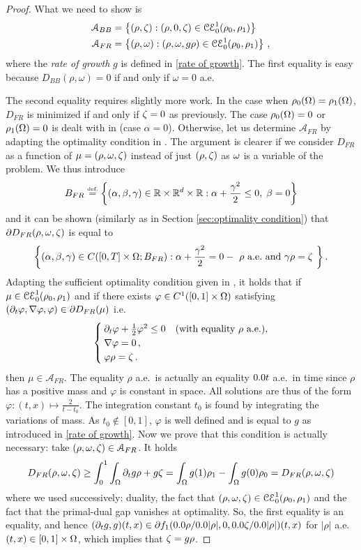 \begin{proof}
What we need to show is
\begin{align*}
\mathcal{A}_{BB} &= \left\{ (\rho,\zeta) : (\rho,0,\zeta) \in \mathcal{CE}_0^1(\rho_0,\rho_1) \right\} \\
\mathcal{A}_{FR} &= \left\{ (\rho,\omega) : (\rho,\omega,g \rho) \in \mathcal{CE}_0^1(\rho_0,\rho_1)  \right\}\, ,
\end{align*}
where the \emph{rate of growth} $g$ is defined in \eqref{rate of growth}. The first equality is easy because $D_{BB}(\rho, \omega)=0$ if and only if $\omega=0$ a.e.

The second equality requires slightly more work. In the case when $\rho_0(\Omega)=\rho_1(\Omega)$, $D_{FR}$ is minimized if and only if $\zeta=0$ as previously. The case $\rho_0(\Omega)=0$ or $\rho_1(\Omega)=0$ is dealt with in  (case $\alpha=0$). Otherwise, let us determine $\mathcal{A}_{FR}$ by adapting the optimality condition in . The argument is clearer if we consider $D_{FR}$ as a function of  $\mu=(\rho,\omega,\zeta)$ instead of just $(\rho,\zeta)$ as $\omega$ is a variable of the problem. We thus introduce
\[
B_{FR} \stackrel{\mbox{\upshape\tiny def.}}{=} \left\{ (\alpha,\beta,\gamma)\in \mathbb{R} \times \mathbb{R}^d \times \mathbb{R} : \alpha +\frac{\gamma^2}{2} \leq 0, \; \beta =0 \right\}
\]
and it can be shown (similarly as in Section \ref{sec:optimality condition}) that $\partial D_{FR} (\rho,\omega,\zeta)$ is equal to
\[
 \left\{ (\alpha,\beta, \gamma) \in C([0,T] \times \Omega; B_{FR}) :
\alpha+\frac{\gamma^2}{2} = 0 -\text{ $\rho$ a.e.\ and $\gamma \rho = \zeta$ }
\right\}.
\]
Adapting the sufficient optimality condition given in , it holds that if $\mu\in \mathcal{CE}_0^1(\rho_0,\rho_1)$ and if
there exists $\varphi \in C^1([0,1] \times \Omega)$ satisfying $(\partial_t \varphi, \nabla \varphi, \varphi)\in \partial D_{FR} (\mu) $ i.e.
\[
\begin{cases}
 \partial_t \varphi + \frac12 \varphi^2 \leq 0 &(\text{with equality $\rho$ a.e.}),\\
\nabla \varphi = 0\, ,\\
\varphi \rho = \zeta \, .
\end{cases}
\] 
then $\mu \in \mathcal{A}_{FR}$.
%
The equality $\rho$ a.e.\ is actually an equality $\d t$ a.e.\ in time since $\rho$ has a positive mass and $\varphi$ is constant in space. All solutions are thus of the form $\varphi : (t,x) \mapsto \frac{2}{t-t_0}$. The integration constant $t_0$ is found by integrating the variations of mass. As $t_0\notin [0,1]$, $\varphi$ is well defined and is equal to $g$ as introduced in \eqref{rate of growth}. Now we prove that this condition is actually necessary: take $(\rho,\omega,\zeta) \in \mathcal{A}_{FR}$. It holds
\[
D_{FR}(\rho,\omega,\zeta) \geq \int_0^1 \int_{\Omega} \partial_t g \rho + g \zeta = \int_{\Omega} g(1)\rho_1 - \int_{\Omega} g(0) \rho_0 = D_{FR}(\rho,\omega,\zeta)
\]
where we used successively: duality, the fact that $(\rho,\omega,\zeta)\in \mathcal{CE}_0^1(\rho_0,\rho_1)$ and the fact that the primal-dual gap vanishes at optimality. So, the first equality is an equality, and hence $(\D_t g,g)(t,x) \in \D f_1(\d \rho / \d |\rho| , 0, \d \Z / \d |\rho|)(t,x)$ for $|\rho|$ a.e.\ $(t,x)\in [0,1]\times \Omega$, which implies that $\zeta = g\rho$.
\end{proof}

